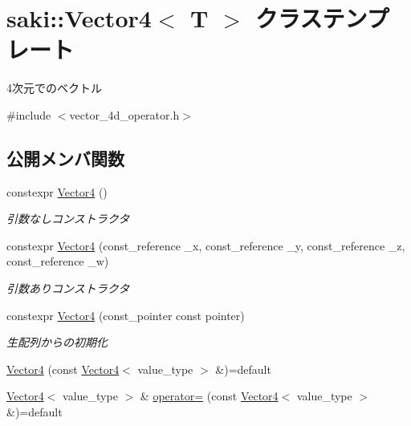 \hypertarget{classsaki_1_1_vector4}{}\section{saki\+:\+:Vector4$<$ T $>$ クラステンプレート}
\label{classsaki_1_1_vector4}


4次元でのベクトル  




{\ttfamily \#include $<$vector\+\_\+4d\+\_\+operator.\+h$>$}

\subsection*{公開メンバ関数}
\begin{DoxyCompactItemize}
\item 
constexpr \mbox{\hyperlink{classsaki_1_1_vector4_a9e8579274314ee2639d60c501c8ecf61}{Vector4}} ()
\begin{DoxyCompactList}\small\item\em 引数なしコンストラクタ \end{DoxyCompactList}\item 
constexpr \mbox{\hyperlink{classsaki_1_1_vector4_a0f448af7e8a95317faaeb2eddc34f953}{Vector4}} (const\+\_\+reference \+\_\+x, const\+\_\+reference \+\_\+y, const\+\_\+reference \+\_\+z, const\+\_\+reference \+\_\+w)
\begin{DoxyCompactList}\small\item\em 引数ありコンストラクタ \end{DoxyCompactList}\item 
constexpr \mbox{\hyperlink{classsaki_1_1_vector4_a2da5c000afd44b896e50096396ddab0c}{Vector4}} (const\+\_\+pointer const pointer)
\begin{DoxyCompactList}\small\item\em 生配列からの初期化 \end{DoxyCompactList}\item 
\mbox{\hyperlink{classsaki_1_1_vector4_ad76d113b35be67e9ee27f1482900d8e2}{Vector4}} (const \mbox{\hyperlink{classsaki_1_1_vector4}{Vector4}}$<$ value\+\_\+type $>$ \&)=default
\item 
\mbox{\hyperlink{classsaki_1_1_vector4}{Vector4}}$<$ value\+\_\+type $>$ \& \mbox{\hyperlink{classsaki_1_1_vector4_a41f953f5fc1eee1909a773ca7a1ed647}{operator=}} (const \mbox{\hyperlink{classsaki_1_1_vector4}{Vector4}}$<$ value\+\_\+type $>$ \&)=default
\item 

\end{DoxyCompactItemize}
